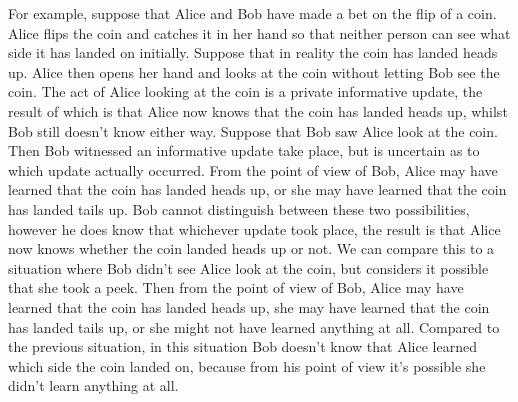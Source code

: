 For example, suppose that Alice and Bob have made a bet on the flip of a coin. 
Alice flips the coin and catches it in her hand so that neither person can see what side it has landed on initially.
Suppose that in reality the coin has landed heads up.
Alice then opens her hand and looks at the coin without letting Bob see the coin.
The act of Alice looking at the coin is a private informative update, the result of which is that Alice now knows that the coin has landed heads up, whilst Bob still doesn't know either way.
Suppose that Bob saw Alice look at the coin.
Then Bob witnessed an informative update take place, but is uncertain as to which update actually occurred.
From the point of view of Bob, Alice may have learned that the coin has landed heads up, or she may have learned that the coin has landed tails up.
Bob cannot distinguish between these two possibilities, however he does know that whichever update took place, the result is that Alice now knows whether the coin landed heads up or not.
We can compare this to a situation where Bob didn't see Alice look at the coin, but considers it possible that she took a peek.
Then from the point of view of Bob, Alice may have learned that the coin has landed heads up, she may have learned that the coin has landed tails up, or she might not have learned anything at all.
Compared to the previous situation, in this situation Bob doesn't know that Alice learned which side the coin landed on, because from his point of view it's possible she didn't learn anything at all.

